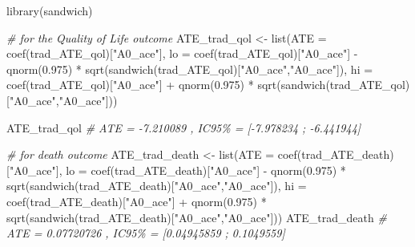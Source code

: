 \documentclass[
]{book}
\newenvironment{Shaded}{\begin{snugshade}}{\end{snugshade}}
\newcommand{\AttributeTok}[1]{\textcolor[rgb]{0.77,0.63,0.00}{#1}}
\newcommand{\CommentTok}[1]{\textcolor[rgb]{0.56,0.35,0.01}{\textit{#1}}}
\newcommand{\FloatTok}[1]{\textcolor[rgb]{0.00,0.00,0.81}{#1}}
\newcommand{\FunctionTok}[1]{\textcolor[rgb]{0.00,0.00,0.00}{#1}}
\newcommand{\NormalTok}[1]{#1}
\newcommand{\OtherTok}[1]{\textcolor[rgb]{0.56,0.35,0.01}{#1}}
\newcommand{\SpecialCharTok}[1]{\textcolor[rgb]{0.00,0.00,0.00}{#1}}
\newcommand{\StringTok}[1]{\textcolor[rgb]{0.31,0.60,0.02}{#1}}
\begin{document}
\begin{Shaded}
\begin{Highlighting}[]
\FunctionTok{library}\NormalTok{(sandwich)}

\CommentTok{\# for the Quality of Life outcome}
\NormalTok{ATE\_trad\_qol }\OtherTok{\textless{}{-}} \FunctionTok{list}\NormalTok{(}\AttributeTok{ATE =} \FunctionTok{coef}\NormalTok{(trad\_ATE\_qol)[}\StringTok{"A0\_ace"}\NormalTok{],}
                     \AttributeTok{lo =} \FunctionTok{coef}\NormalTok{(trad\_ATE\_qol)[}\StringTok{"A0\_ace"}\NormalTok{] }\SpecialCharTok{{-}} \FunctionTok{qnorm}\NormalTok{(}\FloatTok{0.975}\NormalTok{) }\SpecialCharTok{*}
                       \FunctionTok{sqrt}\NormalTok{(}\FunctionTok{sandwich}\NormalTok{(trad\_ATE\_qol)[}\StringTok{"A0\_ace"}\NormalTok{,}\StringTok{"A0\_ace"}\NormalTok{]),}
                     \AttributeTok{hi =} \FunctionTok{coef}\NormalTok{(trad\_ATE\_qol)[}\StringTok{"A0\_ace"}\NormalTok{] }\SpecialCharTok{+} \FunctionTok{qnorm}\NormalTok{(}\FloatTok{0.975}\NormalTok{) }\SpecialCharTok{*}
                       \FunctionTok{sqrt}\NormalTok{(}\FunctionTok{sandwich}\NormalTok{(trad\_ATE\_qol)[}\StringTok{"A0\_ace"}\NormalTok{,}\StringTok{"A0\_ace"}\NormalTok{]))}

\NormalTok{ATE\_trad\_qol}
\CommentTok{\# ATE = {-}7.210089 , IC95\% = [{-}7.978234 ; {-}6.441944]}

\CommentTok{\# for death outcome}
\NormalTok{ATE\_trad\_death }\OtherTok{\textless{}{-}} \FunctionTok{list}\NormalTok{(}\AttributeTok{ATE =} \FunctionTok{coef}\NormalTok{(trad\_ATE\_death)[}\StringTok{"A0\_ace"}\NormalTok{],}
                       \AttributeTok{lo =} \FunctionTok{coef}\NormalTok{(trad\_ATE\_death)[}\StringTok{"A0\_ace"}\NormalTok{] }\SpecialCharTok{{-}} \FunctionTok{qnorm}\NormalTok{(}\FloatTok{0.975}\NormalTok{) }\SpecialCharTok{*}
                         \FunctionTok{sqrt}\NormalTok{(}\FunctionTok{sandwich}\NormalTok{(trad\_ATE\_death)[}\StringTok{"A0\_ace"}\NormalTok{,}\StringTok{"A0\_ace"}\NormalTok{]),}
                       \AttributeTok{hi =} \FunctionTok{coef}\NormalTok{(trad\_ATE\_death)[}\StringTok{"A0\_ace"}\NormalTok{] }\SpecialCharTok{+} \FunctionTok{qnorm}\NormalTok{(}\FloatTok{0.975}\NormalTok{) }\SpecialCharTok{*}
                         \FunctionTok{sqrt}\NormalTok{(}\FunctionTok{sandwich}\NormalTok{(trad\_ATE\_death)[}\StringTok{"A0\_ace"}\NormalTok{,}\StringTok{"A0\_ace"}\NormalTok{]))}
\NormalTok{ATE\_trad\_death}
\CommentTok{\# ATE = 0.07720726 , IC95\% = [0.04945859 ; 0.1049559]}


\end{Highlighting}
\end{Shaded}
\end{document}
